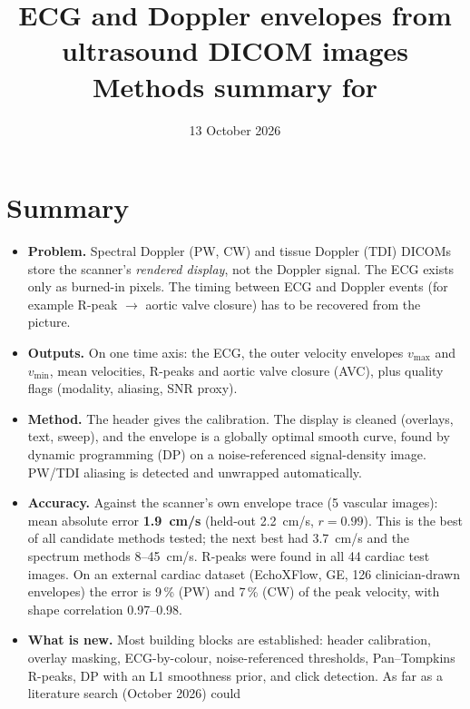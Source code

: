 \documentclass[10pt,a4paper]{article}
\title{\textbf{ECG and Doppler envelopes from ultrasound DICOM images}\\[2pt]
\large Methods summary for \code{dicom2waveform\_standalone.py}}
\date{13 October 2026}
\newcommand{\vmax}{v_{\max}}
\newcommand{\vmin}{v_{\min}}
\begin{document}
\maketitle

\begin{center}
\end{center}

\section*{Summary}
\begin{itemize}
\item \textbf{Problem.} Spectral Doppler (PW, CW) and tissue Doppler (TDI) DICOMs store the scanner's
\emph{rendered display}, not the Doppler signal. The ECG exists only as burned-in pixels. The timing between
ECG and Doppler events (for example R-peak $\to$ aortic valve closure) has to be recovered from the picture.
\item \textbf{Outputs.} On one time axis: the ECG, the outer velocity envelopes $\vmax$ and $\vmin$, mean
velocities, R-peaks and aortic valve closure (AVC), plus quality flags (modality, aliasing, SNR proxy).
\item \textbf{Method.} The header gives the calibration. The display is cleaned (overlays, text, sweep), and the
envelope is a globally optimal smooth curve, found by dynamic programming (DP) on a noise-referenced
signal-density image. PW/TDI aliasing is detected and unwrapped automatically.
\item \textbf{Accuracy.} Against the scanner's own envelope trace (5 vascular images): mean absolute error
\textbf{1.9~cm/s} (held-out 2.2~cm/s, $r=0.99$). This is the best of all candidate methods tested; the next best had 3.7~cm/s and the
spectrum methods 8--45~cm/s. R-peaks were found in all 44 cardiac test images. On an external cardiac dataset (EchoXFlow, GE,
126 clinician-drawn envelopes) the error is 9\,\% (PW) and 7\,\% (CW) of the peak velocity, with shape correlation 0.97--0.98.
\item \textbf{What is new.} Most building blocks are established: header calibration, overlay masking, ECG-by-colour, noise-referenced
thresholds, Pan--Tompkins R-peaks, DP with an L1 smoothness prior, and click detection. As far as a literature search (October 2026) could

\end{itemize}
\end{document}
